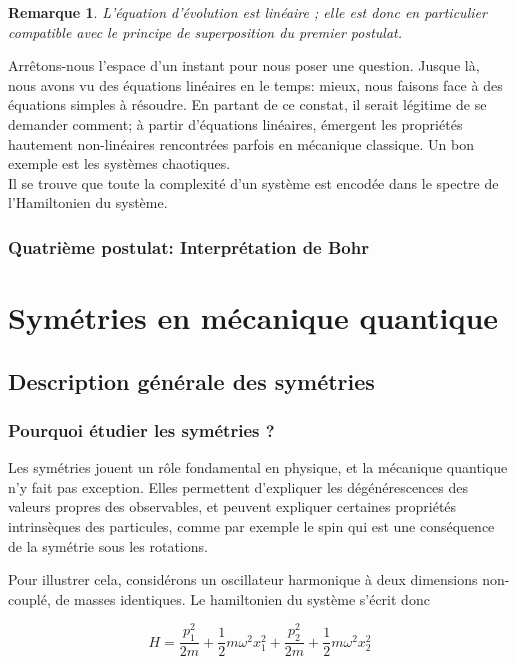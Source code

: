 \documentclass[11pt,twoside,a4paper]{report}
\numberwithin{equation}{part}
\newtheorem{remark}[theorem]{Remarque}
\begin{document}
\begin{remark}
    L'équation d'évolution est linéaire ; elle est donc en particulier compatible avec le principe de superposition du premier postulat.
\end{remark}

Arrêtons-nous l'espace d'un instant pour nous poser une question. Jusque là, nous avons vu des équations linéaires en le temps: mieux, nous faisons face à des équations simples à résoudre. En partant de ce constat, il serait légitime de se demander comment; à partir d'équations linéaires, émergent les propriétés hautement non-linéaires rencontrées parfois en mécanique classique. Un bon exemple est les systèmes chaotiques.\\

Il se trouve que toute la complexité d'un système est encodée dans le spectre de l'Hamiltonien du système.

\section{Quatrième postulat: Interprétation de Bohr}



\part{Symétries en mécanique quantique}

\chapter{Description générale des symétries}

\section{Pourquoi étudier les symétries ?}

Les symétries jouent un rôle fondamental en physique, et la mécanique quantique n'y fait pas exception. Elles permettent d'expliquer les dégénérescences des valeurs propres des observables, et peuvent expliquer certaines propriétés intrinsèques des particules, comme par exemple le spin qui est une conséquence de la symétrie sous les rotations.

Pour illustrer cela, considérons un oscillateur harmonique à deux dimensions non-couplé, de masses identiques. Le hamiltonien du système s'écrit donc

\begin{equation}
  H = \frac{p_1^2}{2m} + \frac{1}{2}m\omega^2x_1^2 + \frac{p_2^2}{2m} + \frac{1}{2}m\omega^2x_2^2
\end{equation}
\end{document}
